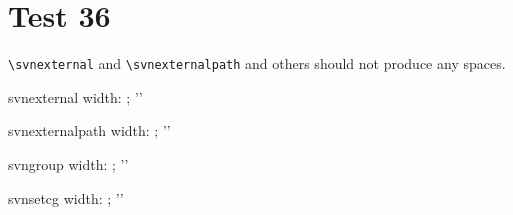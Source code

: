 \documentclass[12pt]{report}
\begin{document}
\chapter{Test 36}
\verb+\svnexternal+ and \verb+\svnexternalpath+ and others should not produce any spaces.

\newlength{\mywidth}
\newsavebox{\mybox}
\settowidth{\mywidth}{\usebox{\mybox}}
\noindent
svnexternal width: \the\mywidth; '\usebox{\mybox}'\\

\settowidth{\mywidth}{\usebox{\mybox}}
\noindent
svnexternalpath width: \the\mywidth; '\usebox{\mybox}'\\

\settowidth{\mywidth}{\usebox{\mybox}}
\noindent
svngroup width: \the\mywidth; '\usebox{\mybox}'\\

\settowidth{\mywidth}{\usebox{\mybox}}
\noindent
svnsetcg width: \the\mywidth; '\usebox{\mybox}'\\
\end{document}
